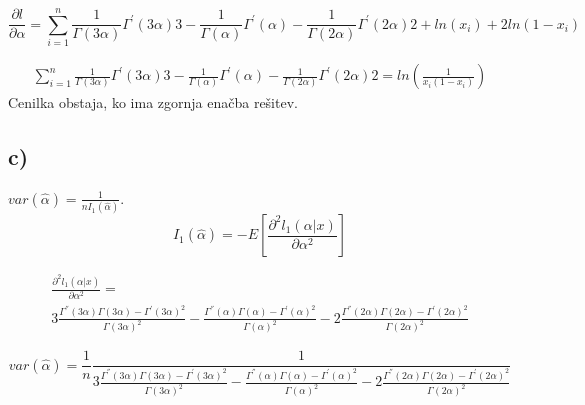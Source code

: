 \documentclass{article}
\begin{document}
\begin{equation*}
\frac{\partial l}{\partial \alpha} = \sum_{i = 1}^n \frac{1}{\Gamma(3\alpha)} \Gamma^{'}(3\alpha) 3 -
\frac{1}{\Gamma(\alpha)} \Gamma^{'}(\alpha) - \frac{1}{\Gamma(2\alpha)} \Gamma^{'}(2\alpha) 2 +
ln(x_i) + 2ln(1-x_i)
\end{equation*}

\begin{equation*}
\begin{split}
\sum_{i = 1}^n \frac{1}{\Gamma(3\alpha)} \Gamma^{'}(3\alpha) 3 -
\frac{1}{\Gamma(\alpha)} \Gamma^{'}(\alpha) - \frac{1}{\Gamma(2\alpha)} \Gamma^{'}(2\alpha) 2 =
ln(\frac{1}{x_i(1-x_i)})
\end{split}
\end{equation*}
Cenilka obstaja, ko ima zgornja enačba rešitev.\\

\subsection*{c)}
$var(\hat{\alpha}) = \frac{1}{nI_1(\hat{\alpha})}$.
\begin{equation*}
I_1(\hat{\alpha}) = -E\left[  \frac{\partial^2l_1(\alpha|x)}{\partial \alpha^2}   \right]
\end{equation*}

\begin{equation*}
\begin{split}
\frac{\partial^2l_1(\alpha|x)}{\partial \alpha^2} =\\  3\frac{\Gamma^{''}(3\alpha)\Gamma(3\alpha) - \Gamma^{'}(3\alpha)^2}{\Gamma(3\alpha)^2} -
\frac{\Gamma^{''}(\alpha)\Gamma(\alpha) - \Gamma^{'}(\alpha)^2}{\Gamma(\alpha)^2} -
2\frac{\Gamma^{''}(2\alpha)\Gamma(2\alpha) - \Gamma^{'}(2\alpha)^2}{\Gamma(2\alpha)^2}
\end{split}
\end{equation*}

\begin{equation*}
var(\hat{\alpha}) =\frac{1}{n} \frac{1}{ 3\frac{\Gamma^{''}(3\alpha)\Gamma(3\alpha) - \Gamma^{'}(3\alpha)^2}{\Gamma(3\alpha)^2} -
\frac{\Gamma^{''}(\alpha)\Gamma(\alpha) - \Gamma^{'}(\alpha)^2}{\Gamma(\alpha)^2} -
2\frac{\Gamma^{''}(2\alpha)\Gamma(2\alpha) - \Gamma^{'}(2\alpha)^2}{\Gamma(2\alpha)^2}}
\end{equation*}
\end{document}
